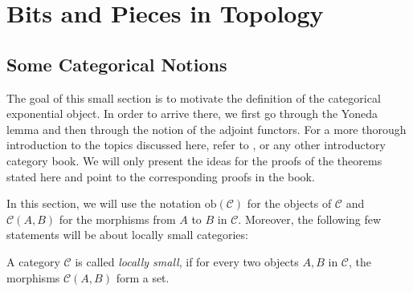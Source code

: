 \chapter{Bits and Pieces in Topology}
\section{Some Categorical Notions}
The goal of this small section is to motivate the definition of the categorical exponential object. In order to arrive there, we first go through the Yoneda lemma and then through the notion of the adjoint functors. For a more thorough introduction to the topics discussed here, refer to \cite{basic_cat}, or any other introductory category book. We will only present the ideas for the proofs of the theorems stated here and point to the corresponding proofs in the book.

In this section, we will use the notation $\mathrm{ob}(\mathcal{C})$ for the objects of $\mathcal{C}$ and $\mathcal{C}(A,B)$ for the morphisms from $A$ to $B$ in $\mathcal{C}$. Moreover, the following few statements will be about locally small categories:
\begin{definition} A category $\mathcal{C}$ is called \emph{locally small}, if for every two objects $A,B$ in $\mathcal{C}$, the morphisms $\mathcal{C}(A,B)$ form a set.
\end{definition}

